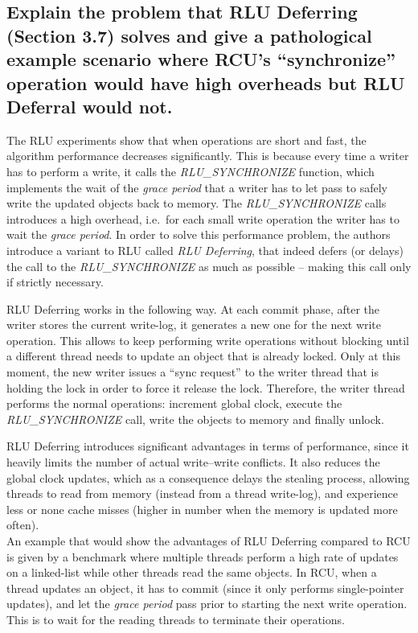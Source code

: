 \begin{refsection}
\subsection*{Explain the problem that RLU Deferring (Section 3.7) solves and
  give a pathological example scenario where RCU’s ``synchronize'' operation
  would have high overheads but RLU Deferral would not.}
\label{sec:member42}
\vspace{-5pt}
The RLU experiments show that when operations are short and fast, the
algorithm performance decreases significantly.
%
This is because every time a writer has to perform a write, it calls the
\emph{RLU\_SYNCHRONIZE} function, which implements the wait of the \emph{grace
  period} that a writer has to let pass to safely write the updated objects
back to memory.
%
The \emph{RLU\_SYNCHRONIZE} calls introduces a high overhead, i.e.\ for each
small write operation the writer has to wait the \emph{grace period}.
%
In order to solve this performance problem, the authors introduce a variant to
RLU called \emph{RLU Deferring}, that indeed defers (or delays) the call to
the \emph{RLU\_SYNCHRONIZE} as much as possible -- making this call only if
strictly necessary.

RLU Deferring works in the following way.
%
At each commit phase, after the writer stores the current write-log, it
generates a new one for the next write operation.
%
This allows to keep performing write operations without blocking until a
different thread needs to update an object that is already locked.
%
Only at this moment, the new writer issues a ``sync request'' to the writer
thread that is holding the lock in order to force it release the lock.
%
Therefore, the writer thread performs the normal operations: increment global
clock, execute the \emph{RLU\_SYNCHRONIZE} call, write the objects to memory
and finally unlock.

RLU Deferring introduces significant advantages in terms of performance, since
it heavily limits the number of actual write--write conflicts.
%
It also reduces the global clock updates, which as a consequence delays the
stealing process, allowing threads to read from memory (instead from a thread
write-log), and experience less or none cache misses (higher in number when
the memory is updated more often).
\\

An example that would show the advantages of RLU Deferring compared to RCU is
given by a benchmark where multiple threads perform a high rate of updates on
a linked-list while other threads read the same objects.
%
In RCU, when a thread updates an object, it has to commit (since it only
performs single-pointer updates), and let the \emph{grace period} pass prior
to starting the next write operation.
%
This is to wait for the reading threads to terminate their operations.


\end{refsection}
